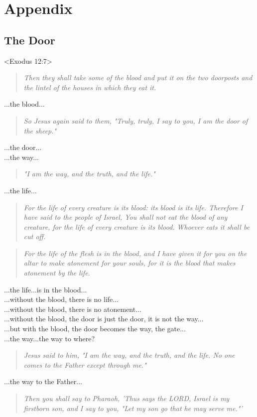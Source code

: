 \documentclass[10pt,oneside,footinclude=true,headinclude=true]{scrbook} %
\newcommand\quot[1]{
	\begin{quote}\textit{\small#1}\end{quote}
}
\begin{document}
\appendix
\cleardoublepage
\part{Appendix}


\chapter{The Door}
<Exodus 12:7>
\quot{Then they shall take some of the blood and put it on the two doorposts and the lintel of the houses in which they eat it.}

\noindent...the blood...

\quot{So Jesus again said to them, "Truly, truly, I say to you, I am the door of the sheep."}

\noindent...the door...\\
...the way...

\quot{"I am the way, and the truth, and the life."}

\noindent...the life...

\quot{For the life of every creature is its blood: its blood is its life. Therefore I have said to the people of Israel, You shall not eat the blood of any creature, for the life of every creature is its blood. Whoever eats it shall be cut off.}

\quot{For the life of the flesh is in the blood, and I have given it for you on the altar to make atonement for your souls, for it is the blood that makes atonement by the life.}

\noindent...the life...is in the blood...\\
...without the blood, there is no life...\\
...without the blood, there is no atonement...\\
...without the blood, the door is just the door, it is not the way...\\
...but with the blood, the door becomes the way, the gate...\\

\noindent...the way...the way to where?

\quot{Jesus said to him, "I am the way, and the truth, and the life. No one comes to the Father except through me."}

\noindent...the way to the Father...

\quot{Then you shall say to Pharaoh, 'Thus says the LORD, Israel is my firstborn son,  and I say to you, "Let my son go that he may serve me."'}
\end{document}
